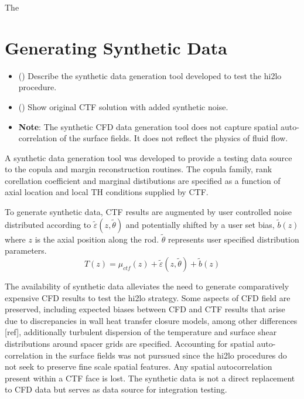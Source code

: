 
The 

\section{Generating Synthetic Data}

\begin{itemize}
    \item (\checkmark) Describe the synthetic data generation tool developed to test the hi2lo procedure.
        \begin{itemize}
        \end{itemize}
    \item (\checkmark) Show original CTF solution with added synthetic noise.
    \item \textbf{Note}: The synthetic CFD data generation tool does not capture spatial auto-correlation of the surface fields.  It does not reflect
        the physics of fluid flow.
\end{itemize}

A synthetic data generation tool was developed to provide a testing data source to the copula and margin reconstruction routines.  The copula family, rank corellation coefficient and marginal distibutions are specified as a function of axial location and local TH conditions supplied by CTF.

To generate synthetic data, CTF results are augmented by user controlled noise distributed according to
    $\tilde \varepsilon(z, \tilde \theta)$
    and potentially shifted by a user set bias,
    $\tilde b(z)$ where $z$ is the axial position along the rod.
    $\tilde \theta$ represents user specified distribution parameters.
    \begin{equation}
        T(z) = \mu_{ctf}(z) + \tilde \varepsilon (z, \tilde \theta) + \tilde b(z)
    \end{equation}


The availability of synthetic data alleviates the need to generate comparatively expensive CFD results to test the hi2lo strategy.  Some aspects of CFD field are preserved, including expected biases between CFD and CTF results that arise due to discrepancies in wall heat transfer closure models, among other differences [ref], additionally turbulent dispersion of the temperature and surface shear distributions around spacer grids are specified.  Accounting for spatial auto-correlation in the surface fields was not purssued since the hi2lo procedures do not seek to preserve fine scale spatial features.  Any spatial autocorrelation present within a CTF face is lost.  The synthetic data is not a direct replacement to CFD data but serves as data source for integration testing.

